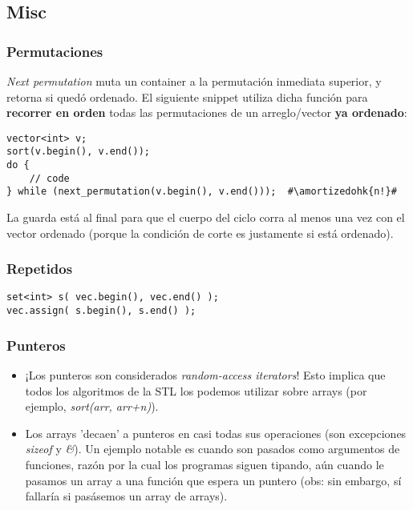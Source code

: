 
\subsection{Misc}

\subsubsection*{Permutaciones}

\textit{Next permutation} muta un container a la permutación inmediata superior, y retorna si quedó ordenado. El siguiente snippet utiliza dicha función para \textbf{recorrer en orden} todas las permutaciones de un arreglo/vector \textbf{ya ordenado}:

\begin{lstlisting}
vector<int> v;
sort(v.begin(), v.end());
do {
    // code
} while (next_permutation(v.begin(), v.end()));  #\amortizedohk{n!}#
\end{lstlisting}

La guarda está al final para que el cuerpo del ciclo corra al menos una vez con el vector ordenado (porque la condición de corte es justamente si está ordenado).

\subsubsection*{Repetidos}
\begin{lstlisting}
set<int> s( vec.begin(), vec.end() );
vec.assign( s.begin(), s.end() );
\end{lstlisting}

\subsubsection*{Punteros}

\begin{itemize}
    \item ¡Los punteros son considerados \textit{random-access iterators}! Esto implica que todos los algoritmos de la STL los podemos utilizar sobre arrays (por ejemplo, \textit{sort(arr, arr+n)}).
    \item Los arrays 'decaen' a punteros en casi todas sus operaciones (son excepciones \textit{sizeof} y \textit{\&}). Un ejemplo notable es cuando son pasados como argumentos de funciones, razón por la cual los programas siguen tipando, aún cuando le pasamos un array a una función que espera un puntero (obs: sin embargo, sí fallaría si pasásemos un array de arrays).
\end{itemize}

